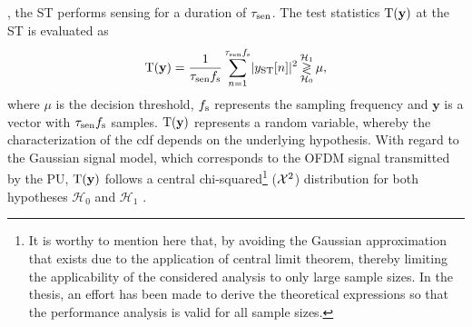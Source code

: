 \subsection{}\label{ssec_IS:pd}
, the ST performs sensing for a duration of $\tau_{\text{sen}}$. The test statistics $\operatorname*{\text{T}(\textbf{y})}$ at the ST is evaluated as   
\begin{align}
\operatorname*{\text{T}(\textbf{y})} = {\frac{1}{{\tau_{\text{sen}} f_{\text{s}}}}\sum_{n=1}^{\tau_{\text{sen}} f_{\text{s}}}} { |y_{\text{ST}}[n]|^2} \mathop{\gtrless}_{\mathcal{H}_0}^{\mathcal{H}_1} \mu, 
\label{eq_IS:test_st}
\end{align}
where $\mu$ is the decision threshold, $f_{\text{s}}$ represents the sampling frequency and $\textbf{y}$ is a vector with $\tau_{\text{sen}} f_{\text{s}}$ samples. $\operatorname*{\text{T}(\textbf{y})}$ represents a random variable, whereby the characterization of the cdf depends on the underlying hypothesis. With regard to the Gaussian signal model, which corresponds to the OFDM signal transmitted by the PU, $\operatorname*{\text{T}(\textbf{y})}$ follows a central chi-squared\footnote{It is worthy to mention here that, by avoiding the Gaussian approximation that exists due to the application of central limit theorem, thereby limiting the applicability of the considered analysis to only large sample sizes. In the thesis, an effort has been made to derive the theoretical expressions so that the performance analysis is valid for all sample sizes.}  ($\cchi2$) distribution for both hypotheses $\mathcal{H}_0$ and $\mathcal{H}_1$ \cite{Kay}. 

